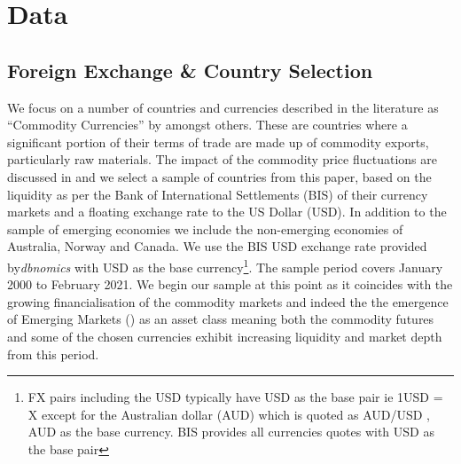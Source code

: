\section{Data}
\label{sec:data}
\subsection{Foreign Exchange \& Country Selection}
We focus on a number of countries and currencies described in the literature as ``Commodity Currencies'' by \cite{cocurrencies} amongst others. These are countries where a significant portion of their terms of trade are made up of commodity exports, particularly raw materials. The impact of the commodity price fluctuations are discussed in \cite{coboomexport} and we select a sample of countries from this paper, based on the liquidity as per the Bank of International Settlements (BIS) \cite{bisturnover} of their currency markets and a floating exchange rate to the US Dollar (USD). In addition to the sample of emerging economies we include the non-emerging economies of Australia, Norway and Canada. We use the BIS USD exchange rate provided by\textit{dbnomics} \cite{dbnomics} with USD as the base currency\footnote{FX pairs including the USD typically have USD as the base pair ie 1USD = X except for the Australian dollar (AUD) which is quoted as AUD/USD , AUD as the base currency. BIS provides all currencies quotes with USD as the base pair}. The sample period covers January 2000 to February 2021. We begin our sample at this point as it coincides with the growing financialisation of the commodity markets and indeed the the emergence of Emerging Markets (\cite{EMasset}) as an asset class meaning both the commodity futures and some of the chosen currencies exhibit increasing liquidity and market depth from this period.

